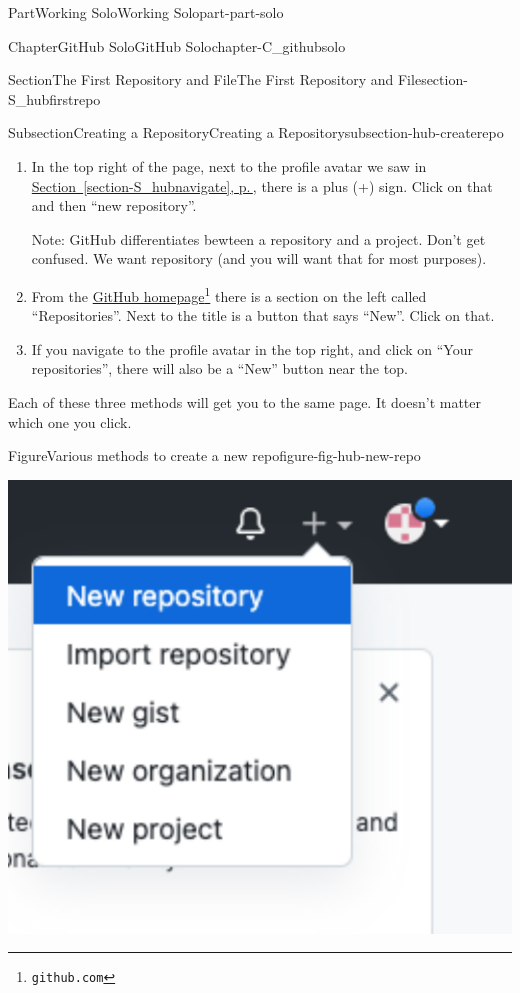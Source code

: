 \documentclass[twoside,10pt,]{book}
\newcommand{\xreffont}{\relax}
\begin{document}
\begin{partptx}{Part}{Working Solo}{}{Working Solo}{}{}{part-part-solo}
\begin{chapterptx}{Chapter}{GitHub Solo}{}{GitHub Solo}{}{}{chapter-C_githubsolo}
\begin{sectionptx}{Section}{The First Repository and File}{}{The First Repository and File}{}{}{section-S_hubfirstrepo}
\begin{subsectionptx}{Subsection}{Creating a Repository}{}{Creating a Repository}{}{}{subsection-hub-createrepo}
\begin{enumerate}
\item{}In the top right of the page, next to the profile avatar we saw in \hyperref[section-S_hubnavigate]{Section~{\xreffont\ref{section-S_hubnavigate}}, p.\,\pageref{section-S_hubnavigate}}, there is a plus (+) sign. Click on that and then ``new repository''.%
\par
Note: GitHub differentiates bewteen a repository and a project. Don't get confused. We want repository (and you will want that for most purposes).%
\item{}From the \href{https://github.com}{GitHub homepage}\footnote{\nolinkurl{github.com}\label{fn-hub-createrepo-c-b-b-a-b}} there is a section on the left called ``Repositories''. Next to the title is a button that says ``New''. Click on that.%
\item{}If you navigate to the profile avatar in the top right, and click on ``Your repositories'', there will also be a ``New'' button near the top.%
\end{enumerate}
Each of these three methods will get you to the same page. It doesn't matter which one you click.%
\begin{figureptx}{Figure}{Various methods to create a new repo}{figure-fig-hub-new-repo}{}%
\begin{sidebyside}{2}{0.025}{0.025}{0.05}%
\begin{sbspanel}{0.45}%
\includegraphics[width=\linewidth]{external/hub_new_repo_navbar.pdf}
\end{sbspanel}%

\end{sidebyside}
\end{figureptx}
\end{subsectionptx}
\end{sectionptx}
\end{chapterptx}
\end{partptx}
\end{document}
